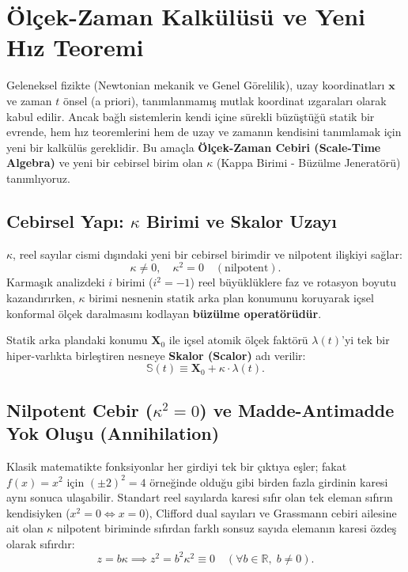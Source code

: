 \section{Ölçek-Zaman Kalkülüsü ve Yeni Hız Teoremi}

\label{sec:olcek_kalkulusu_ana}

Geleneksel fizikte (Newtonian mekanik ve Genel Görelilik), uzay koordinatları $\mathbf{x}$ ve zaman $t$ önsel (a priori), tanımlanmamış mutlak koordinat ızgaraları olarak kabul edilir. Ancak bağlı sistemlerin kendi içine sürekli büzüştüğü statik bir evrende, hem hız teoremlerini hem de uzay ve zamanın kendisini tanımlamak için yeni bir kalkülüs gereklidir. Bu amaçla \textbf{Ölçek-Zaman Cebiri (Scale-Time Algebra)} ve yeni bir cebirsel birim olan $\kappa$ (Kappa Birimi - Büzülme Jeneratörü) tanımlıyoruz.

\subsection{Cebirsel Yapı: \texorpdfstring{$\kappa$}{kappa} Birimi ve Skalor Uzayı}
$\kappa$, reel sayılar cismi dışındaki yeni bir cebirsel birimdir ve nilpotent ilişkiyi sağlar:
\begin{equation}
    \kappa \neq 0, \quad \kappa^2 = 0 \quad (\text{nilpotent}).
    \label{eq:kappa_main}
\end{equation}
Karmaşık analizdeki $i$ birimi ($i^2 = -1$) reel büyüklüklere faz ve rotasyon boyutu kazandırırken, $\kappa$ birimi nesnenin statik arka plan konumunu koruyarak içsel konformal ölçek daralmasını kodlayan \textbf{büzülme operatörüdür}.

Statik arka plandaki konumu $\mathbf{X}_0$ ile içsel atomik ölçek faktörü $\lambda(t)$'yi tek bir hiper-varlıkta birleştiren nesneye \textbf{Skalor (Scalor)} adı verilir:
\begin{equation}
    \mathbb{S}(t) \equiv \mathbf{X}_0 + \kappa \cdot \lambda(t).
    \label{eq:skalor_main}
\end{equation}

\subsection{Nilpotent Cebir (\texorpdfstring{$\kappa^2 = 0$}{kappa\texttwosuperior{} = 0}) ve Madde-Antimadde Yok Oluşu (Annihilation)}
\label{sec:nilpotent_main}
Klasik matematikte fonksiyonlar her girdiyi tek bir çıktıya eşler; fakat $f(x) = x^2$ için $(\pm 2)^2 = 4$ örneğinde olduğu gibi birden fazla girdinin karesi aynı sonuca ulaşabilir. Standart reel sayılarda karesi sıfır olan tek eleman sıfırın kendisiyken ($x^2 = 0 \iff x = 0$), Clifford dual sayıları ve Grassmann cebiri ailesine ait olan $\kappa$ nilpotent biriminde sıfırdan farklı sonsuz sayıda elemanın karesi özdeş olarak sıfırdır:
\begin{equation}
    z = b\kappa \implies z^2 = b^2 \kappa^2 \equiv 0 \quad (\forall b \in \mathbb{R}, \; b \neq 0).
    \label{eq:nilpotent_kare}
\end{equation}

